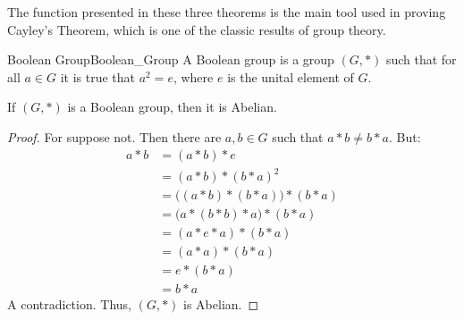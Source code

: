     The function presented in these three theorems is the main tool used in
    proving Cayley's Theorem, which is one of the
    classic results of group theory.
    \begin{fdefinition}{Boolean Group}{Boolean_Group}
        A Boolean group is a group $(G,*)$ such that for all $a\in{G}$ it is
        true that $a^{2}=e$, where $e$ is the unital element of $G$.
    \end{fdefinition}
    \begin{theorem}
        If $(G,*)$ is a Boolean group, then it is Abelian.
    \end{theorem}
    \begin{proof}
        For suppose not. Then there are $a,b\in{G}$ such that $a*b\ne{b}*a$.
        But:
        \begin{align}
            a*b&=
            (a*b)*e
            \tag{Identity}\\
            &=(a*b)*(b*a)^{2}
            \tag{Boolean Property}\\
            &=\big((a*b)*(b*a)\big)*(b*a)
            \tag{Associativity}\\
            &=\big(a*(b*b)*a\big)*(b*a)
            \tag{Associativity}\\
            &=(a*e*a)*(b*a)
            \tag{Boolean Property}\\
            &=(a*a)*(b*a)
            \tag{Identity}\\
            &=e*(b*a)
            \tag{Boolean Property}\\
            &=b*a
            \tag{Identity}
        \end{align}
        A contradiction. Thus, $(G,*)$ is Abelian.
    \end{proof}
